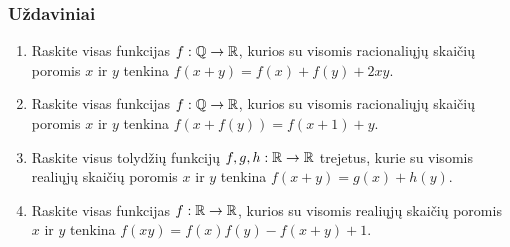 \subsubsection{Uždaviniai}

\begin{enumerate}
  \item Raskite visas funkcijas $f:\mathbb Q\to\mathbb R$, kurios su visomis
    racionaliųjų skaičių poromis $x$ ir $y$ tenkina $f(x+y)=f(x)+f(y)+2xy$.
  \item Raskite visas funkcijas $f:\mathbb Q\to\mathbb R$, kurios su visomis
    racionaliųjų skaičių poromis $x$ ir $y$ tenkina $f(x+f(y))=f(x+1)+y$.
  \item Raskite visus tolydžių funkcijų  $f,g,h:\mathbb R\to\mathbb R$ trejetus,
    kurie su visomis realiųjų skaičių poromis $x$ ir $y$ tenkina
    $f(x+y)=g(x)+h(y)$.
  \item Raskite visas funkcijas $f:\mathbb R\to\mathbb R$, kurios su visomis realiųjų
    skaičių poromis $x$ ir $y$ tenkina $f(xy)=f(x)f(y)-f(x+y)+1$.

\end{enumerate}
